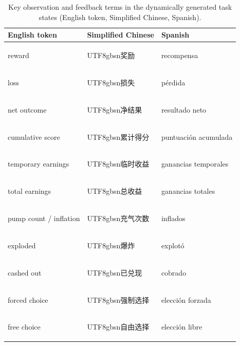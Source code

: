 \documentclass[logo,msc,inf]{infthesis}       %
\begin{document}
\begin{table}[htbp]
\centering
\caption{Key observation and feedback terms in the dynamically generated task states (English token, Simplified Chinese, Spanish).}
\label{tab:term-obs}
\setlength{\tabcolsep}{4pt}%
\begin{tabular}{@{}>{\raggedright\arraybackslash}p{3.3cm}>{\raggedright\arraybackslash}p{2.6cm}>{\raggedright\arraybackslash}p{5.6cm}@{}}
\toprule
\textbf{English token} & \textbf{Simplified Chinese} & \textbf{Spanish} \\
\midrule
\footnotesize\ttfamily reward & {\begin{CJK}{UTF8}{gbsn}奖励\end{CJK}} & recompensa \\
\footnotesize\ttfamily loss & {\begin{CJK}{UTF8}{gbsn}损失\end{CJK}} & p\'erdida \\
\footnotesize\ttfamily net outcome & {\begin{CJK}{UTF8}{gbsn}净结果\end{CJK}} & resultado neto \\
\footnotesize\ttfamily cumulative score & {\begin{CJK}{UTF8}{gbsn}累计得分\end{CJK}} & puntuaci\'on acumulada \\
\footnotesize\ttfamily temporary earnings & {\begin{CJK}{UTF8}{gbsn}临时收益\end{CJK}} & ganancias temporales \\
\footnotesize\ttfamily total earnings & {\begin{CJK}{UTF8}{gbsn}总收益\end{CJK}} & ganancias totales \\
\footnotesize\ttfamily pump count / inflation & {\begin{CJK}{UTF8}{gbsn}充气次数\end{CJK}} & inflados \\
\footnotesize\ttfamily exploded & {\begin{CJK}{UTF8}{gbsn}爆炸\end{CJK}} & explot\'o \\
\footnotesize\ttfamily cashed out & {\begin{CJK}{UTF8}{gbsn}已兑现\end{CJK}} & cobrado \\
\footnotesize\ttfamily forced choice & {\begin{CJK}{UTF8}{gbsn}强制选择\end{CJK}} & elecci\'on forzada \\
\footnotesize\ttfamily free choice & {\begin{CJK}{UTF8}{gbsn}自由选择\end{CJK}} & elecci\'on libre \\
\bottomrule
\end{tabular}
\end{table}
\end{document}

